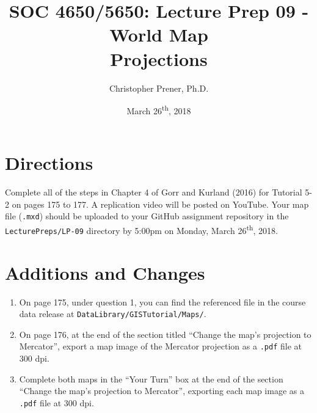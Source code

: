 \documentclass{tufte-handout}
\title{SOC 4650/5650: Lecture Prep 09 - World Map \\Projections}
\author{Christopher Prener, Ph.D.}
\date{March 26\textsuperscript{th}, 2018}
\begin{document}
\maketitle %

\section{Directions}
Complete all of the steps in Chapter 4 of Gorr and Kurland (2016) for Tutorial 5-2 on pages 175 to 177. A replication video will be posted on YouTube. Your map file (\texttt{.mxd}) should be uploaded to your GitHub assignment repository in the \texttt{LecturePreps/LP-09} directory by 5:00pm on Monday, March 26\textsuperscript{th}, 2018.

\vspace{5mm}
\section{Additions and Changes}
\begin{enumerate}
\item On page 175, under question 1, you can find the referenced file in the course data release at \texttt{DataLibrary/GISTutorial/Maps/}.
\item On page 176, at the end of the section titled ``Change the map's projection to Mercator'', export a map image of the Mercator projection as a \texttt{.pdf} file at 300 dpi.
\item Complete both maps in the ``Your Turn'' box at the end of the section ``Change the map's projection to Mercator'', exporting each map image as a \texttt{.pdf} file at 300 dpi.
\end{enumerate}

\end{document}

